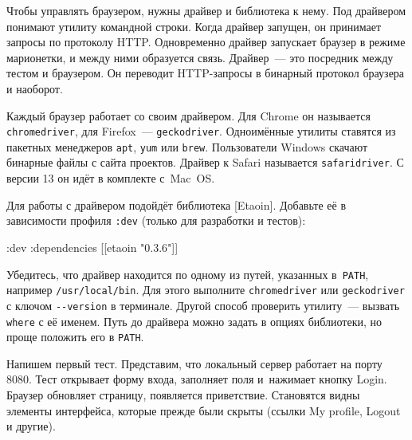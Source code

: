 Чтобы управлять браузером, нужны драйвер и библиотека к нему. Под драйвером
понимают утилиту командной строки. Когда драйвер запущен, он принимает запросы
по протоколу HTTP. Одновременно драйвер запускает браузер в режиме марионетки, и
между ними образуется связь. Драйвер~--- это посредник между тестом и браузером. Он
переводит HTTP-запросы в бинарный протокол браузера и наоборот.


Каждый браузер работает со своим драйвером. Для Chrome он называется
\verb|chromedriver|, для Firefox~--- \verb|geckodriver|. Одноимённые утилиты
ставятся из пакетных менеджеров \verb|apt|, \verb|yum| или
\verb|brew|. Пользователи Windows скачают бинарные файлы с сайта
проектов. Драйвер к Safari называется \verb|safaridriver|. С версии 13 он
идёт в комплекте с~Mac~OS.


Для работы с драйвером подойдёт библиотека [Etaoin].
Добавьте её в зависимости профиля \verb|:dev| (только для разработки и тестов):

\begin{english}
  \begin{clojure}
:dev {:dependencies [[etaoin "0.3.6"]]}
  \end{clojure}
\end{english}

Убедитесь, что драйвер находится по одному из путей, указанных в~\verb|PATH|,
например \verb|/usr/local/bin|. Для этого выполните \texttt{chrome\-driver} или
\verb|geckodriver| с ключом \verb|--version| в терминале. Другой способ
проверить утилиту~--- вызвать \verb|where| с её именем. Путь до драйвера можно
задать в опциях библиотеки, но проще положить его в \verb|PATH|.


Напишем первый тест. Представим, что локальный сервер работает на порту
8080. Тест открывает форму входа, заполняет поля и~нажимает кнопку
Login. Браузер обновляет страницу, появляется приветствие. Становятся видны
элементы интерфейса, которые прежде были скрыты (ссылки My profile, Logout и
другие).

\ifnarrow

